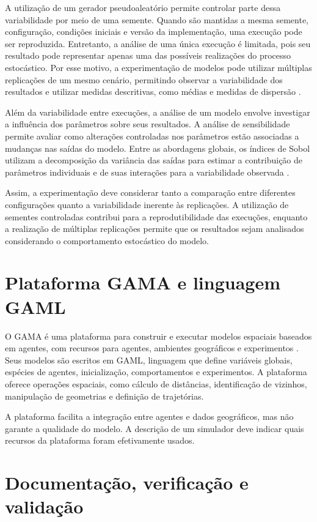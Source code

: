 A utilização de um gerador pseudoaleatório permite controlar parte dessa variabilidade por meio de uma semente. Quando são mantidas a mesma semente, configuração, condições iniciais e versão da implementação, uma execução pode ser reproduzida. Entretanto, a análise de uma única execução é limitada, pois seu resultado pode representar apenas uma das possíveis realizações do processo estocástico. Por esse motivo, a experimentação de modelos pode utilizar múltiplas replicações de um mesmo cenário, permitindo observar a variabilidade dos resultados e utilizar medidas descritivas, como médias e medidas de dispersão \cite{Taillandier2019,garcias_2024}.

Além da variabilidade entre execuções, a análise de um modelo envolve investigar a influência dos parâmetros sobre seus resultados. A análise de sensibilidade permite avaliar como alterações controladas nos parâmetros estão associadas a mudanças nas saídas do modelo. Entre as abordagens globais, os índices de Sobol utilizam a decomposição da variância das saídas para estimar a contribuição de parâmetros individuais e de suas interações para a variabilidade observada \cite{Sobol2001}.

Assim, a experimentação deve considerar tanto a comparação entre diferentes configurações quanto a variabilidade inerente às replicações. A utilização de sementes controladas contribui para a reprodutibilidade das execuções, enquanto a realização de múltiplas replicações permite que os resultados sejam analisados considerando o comportamento estocástico do modelo.
\section{Plataforma GAMA e linguagem GAML}

O GAMA é uma plataforma para construir e executar modelos espaciais baseados em agentes, com recursos para agentes, ambientes geográficos e experimentos \cite{Taillandier2019}. Seus modelos são escritos em GAML, linguagem que define variáveis globais, espécies de agentes, inicialização, comportamentos e experimentos. A plataforma oferece operações espaciais, como cálculo de distâncias, identificação de vizinhos, manipulação de geometrias e definição de trajetórias.

A plataforma facilita a integração entre agentes e dados geográficos, mas não garante a qualidade do modelo. A descrição de um simulador deve indicar quais recursos da plataforma foram efetivamente usados.

\section{Documentação, verificação e validação}

